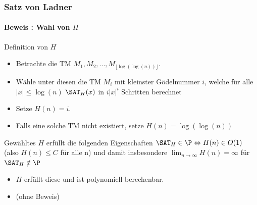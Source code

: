 \begin{frame}
	\frametitle{Satz von Ladner}
	\framesubtitle{Beweis : Wahl von $H$}
	\begin{KITinfoblock}{Definition von $H$}
		\begin{itemize}
		\item Betrachte die TM $M_1, M_2, ..., M_{\lfloor \log(\log(n)) \rfloor}$. \newline
		\item Wähle unter diesen die TM $M_i$ mit kleinster Gödelnummer $i$, welche für alle
		$|x| \leq \log(n) $  ${\SAT}_H(x)$
		in $i|x|^i$ Schritten berechnet
		\item Setze $H(n) = i$. 
		\item Falls eine solche TM nicht existiert, setze $H(n) = \log(\log(n))$
		\end{itemize}
	\end{KITinfoblock}
	\pause
	\begin{KITblock}{Gewähltes $H$ erfüllt die folgenden Eigenschaften}
		${\SAT}_H \in \P \Leftrightarrow H(n) \in O(1)$ (also $H(n) \leq C$ f\"ur alle n) 				\newline
		und damit insbesondere $\lim_{n \to \infty}  H(n) = \infty$ f\"ur ${\SAT}_H
		\notin \P$
	\end{KITblock}
	\pause
	\begin{itemize}
	  \item  $H$ erfüllt diese und ist polynomiell berechenbar.
	  \item (ohne Beweis)
	\end{itemize}
		
\end{frame}
% 	
